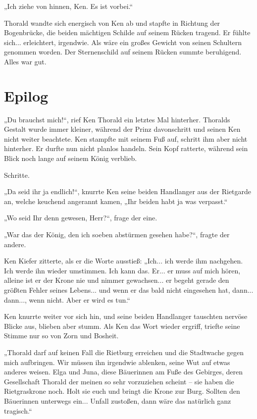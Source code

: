 \documentclass[10pt, a4paper, oneside]{book}
\begin{document}
„Ich ziehe von hinnen, Ken. Es ist vorbei.“

Thorald wandte sich energisch von Ken ab und stapfte in Richtung der Bogenbrücke, die beiden mächtigen Schilde auf seinem Rücken tragend. Er fühlte sich... erleichtert, irgendwie. Als wäre ein großes Gewicht von seinen Schultern genommen worden. Der Sternenschild auf seinem Rücken summte beruhigend. Alles war gut.








\newpage
\section{Epilog}

„Du brauchst mich!“, rief Ken Thorald ein letztes Mal hinterher. Thoralds Gestalt wurde immer kleiner, während der Prinz davonschritt und seinen Ken nicht weiter beachtete. Ken stampfte mit seinem Fuß auf, schritt ihm aber nicht hinterher. Er durfte nun nicht planlos handeln. Sein Kopf ratterte, während sein Blick noch lange auf seinem König verblieb.

Schritte.

„Da seid ihr ja endlich!“, knurrte Ken seine beiden Handlanger aus der Rietgarde an, welche keuchend angerannt kamen, „Ihr beiden habt ja was verpasst.“

„Wo seid Ihr denn gewesen, Herr?“, frage der eine.

„War das der König, den ich soeben abstürmen gesehen habe?“, fragte der andere.

Ken Kiefer zitterte, als er die Worte ausstieß: „Ich... ich werde ihm nachgehen. Ich werde ihn wieder umstimmen. Ich kann das. Er... er muss auf mich hören, alleine ist er der Krone nie und nimmer gewachsen... er begeht gerade den größten Fehler seines Lebens... und wenn er das bald nicht eingesehen hat, dann... dann..., wenn nicht. Aber er wird es tun.“

Ken knurrte weiter vor sich hin, und seine beiden Handlanger tauschten nervöse Blicke aus, blieben aber stumm. Als Ken das Wort wieder ergriff, triefte seine Stimme nur so von Zorn und Bosheit.

„Thorald darf auf keinen Fall die Rietburg erreichen und die Stadtwache gegen mich aufbringen. Wir müssen ihn irgendwie ablenken, seine Wut auf etwas anderes weisen. Elga und Juna, diese Bäuerinnen am Fuße des Gebirges, deren Gesellschaft Thorald der meinen so sehr vorzuziehen scheint – sie haben die Rietgraskrone noch. Holt sie euch und bringt die Krone zur Burg. Sollten den Bäuerinnen unterwegs ein... Unfall zustoßen, dann wäre das natürlich ganz tragisch.“
\end{document}
